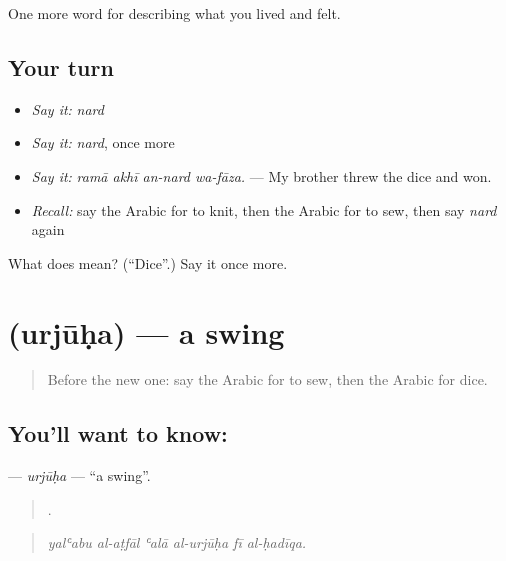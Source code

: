 \begin{grammarlens}[title={What you've built}]
One more word for describing what you lived and felt.
\end{grammarlens}

\subsection*{Your turn}
\begin{itemize}
\raggedright
  \item \emph{Say it:} \emph{nard}
  \item \emph{Say it:} \emph{nard}, once more
  \item \emph{Say it:} \emph{ramā akhī an-nard wa-fāza.} — My brother threw the dice and won.
  \item \emph{Recall:} say the Arabic for to knit, then the Arabic for to sew, then say \emph{nard} again
\end{itemize}

\begin{tcolorbox}[breakable,colback=teal!4,colframe=teal!35!black,title={Before you move on}]
What does  mean? (\textquotedblleft{}Dice\textquotedblright{}.) Say it once more.
\end{tcolorbox}
\section[\texorpdfstring{\ar{أرجوحة} (urjūḥa)}{أرجوحة (urjūḥa)}]{ (urjūḥa) — a swing}

\label{lesson:AR-C539-urjuha}



\begin{quote}
Before the new one: say the Arabic for to sew, then the Arabic for dice.
\end{quote}

\subsection*{You'll want to know: }
\textbf{} — \emph{urjūḥa} — \textquotedblleft{}a swing\textquotedblright{}.

\begin{quote}
     .
\end{quote}

\begin{quote}
\emph{yalʿabu al-aṭfāl ʿalā al-urjūḥa fī al-ḥadīqa.}
\end{quote}

